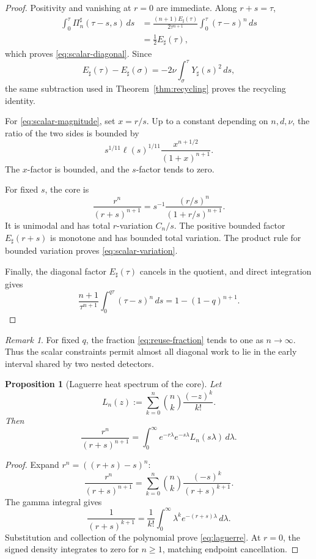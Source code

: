 \documentclass[11pt]{article}
\newtheorem{proposition}[theorem]{Proposition}
\theoremstyle{remark}
\newtheorem{remark}[theorem]{Remark}
\begin{document}
\begin{proof}
Positivity and vanishing at \(r=0\) are immediate.  Along
\(r+s=\tau\),
\[
\begin{aligned}
 \int_0^\tau\Pi_n^\sharp(\tau-s,s)\,ds
 &=
 \frac{(n+1)E_\sharp(\tau)}{2\tau^{n+1}}
 \int_0^\tau(\tau-s)^n\,ds\\
 &=\frac12E_\sharp(\tau),
\end{aligned}
\]
which proves \eqref{eq:scalar-diagonal}.  Since
\[
 E_\sharp(\tau)-E_\sharp(\sigma)
 =-2\nu\int_\sigma^\tau Y_\sharp(s)^2\,ds,
\]
the same subtraction used in Theorem~\ref{thm:recycling} proves the
recycling identity.

For \eqref{eq:scalar-magnitude}, set \(x=r/s\).  Up to a constant
depending on \(n,d,\nu\), the ratio of the two sides is bounded by
\[
 s^{1/11}\ell(s)^{1/11}
 \frac{x^{n+1/2}}{(1+x)^{n+1}}.
\]
The \(x\)-factor is bounded, and the \(s\)-factor tends to zero.

For fixed \(s\), the core is
\[
 \frac{r^n}{(r+s)^{n+1}}
 =s^{-1}\frac{(r/s)^n}{(1+r/s)^{n+1}}.
\]
It is unimodal and has total \(r\)-variation \(C_n/s\).
The positive bounded factor \(E_\sharp(r+s)\) is monotone and has
bounded total variation.  The product rule for bounded variation proves
\eqref{eq:scalar-variation}.

Finally, the diagonal factor \(E_\sharp(\tau)\) cancels in the quotient,
and direct integration gives
\[
 \frac{n+1}{\tau^{n+1}}\int_0^{q\tau}(\tau-s)^n\,ds
 =1-(1-q)^{n+1}.
\]
\end{proof}

\begin{remark}
For fixed \(q\), the fraction \eqref{eq:reuse-fraction} tends to one as
\(n\to\infty\).  Thus the scalar constraints permit almost all diagonal
work to lie in the early interval shared by two nested detectors.
\end{remark}

\begin{proposition}[Laguerre heat spectrum of the core]
\label{prop:laguerre}
Let
\[
 L_n(z):=\sum_{k=0}^n\binom nk\frac{(-z)^k}{k!}.
\]
Then
\begin{equation}
\label{eq:laguerre}
 \boxed{
 \frac{r^n}{(r+s)^{n+1}}
 =
 \int_0^\infty
 e^{-r\lambda}e^{-s\lambda}L_n(s\lambda)\,d\lambda.
 }
\end{equation}
\end{proposition}

\begin{proof}
Expand \(r^n=((r+s)-s)^n\):
\[
 \frac{r^n}{(r+s)^{n+1}}
 =
 \sum_{k=0}^n\binom nk
 \frac{(-s)^k}{(r+s)^{k+1}}.
\]
The gamma integral gives
\[
 \frac1{(r+s)^{k+1}}
 =
 \frac1{k!}\int_0^\infty
 \lambda^ke^{-(r+s)\lambda}\,d\lambda.
\]
Substitution and collection of the polynomial prove
\eqref{eq:laguerre}.  At \(r=0\), the signed density integrates to zero
for \(n\geq1\), matching endpoint cancellation.
\end{proof}
\end{document}
